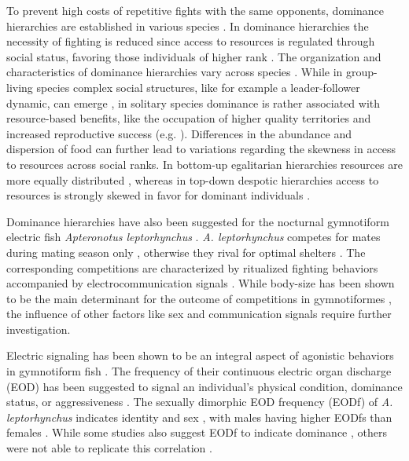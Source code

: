\documentclass[vruler,JEB]{COB}%
\newcommand{\Lepto}{\textit{Apteronotus leptorhynchus}}
\newcommand{\lepto}{\textit{A. leptorhynchus}}
\begin{document}
To prevent high costs of repetitive fights with the same opponents, dominance hierarchies are established in various species \citep{Creel1996, Janson1985, Cluttonbrock1979}. In dominance hierarchies the necessity of fighting is reduced since access to resources is regulated through social status, favoring those individuals of higher rank \citep{Wauters1992, Taves2009}. The organization and characteristics of dominance hierarchies vary across species \citep{Janson1985, Cigliano1993, Sapolsky2005}. While in group-living species complex social structures, like for example a leader-follower dynamic, can emerge \citep{Strandburg2018}, in solitary species dominance is rather associated with resource-based benefits, like the occupation of higher quality territories and increased reproductive success (e.g. \citealp{Cigliano1993}). Differences in the abundance and dispersion of food can further lead to variations regarding the skewness in access to resources across social ranks. In bottom-up egalitarian hierarchies resources are more equally distributed \citep{Sapolsky2005}, whereas in top-down despotic hierarchies access to resources is strongly skewed in favor for dominant individuals \citep{Kappeler2008}.

Dominance hierarchies have also been suggested for the nocturnal gymnotiform electric fish \Lepto{} \citep{Dunlap2002,Stamper2010,Raab2019}. \lepto{} competes for mates during mating season only \citep{Hagedorn1985, Henninger2018}, otherwise they rival for optimal shelters \citep{Dunlap2002}. The corresponding competitions are characterized by ritualized fighting behaviors accompanied by electrocommunication signals \citep{Triefenbach2008, Smith2013}. While body-size has been shown to be the main determinant for the outcome of competitions in gymnotiformes \citep{Silva2012, Triefenbach2008, Dunlap2002}, the influence of other factors like sex and communication signals require further investigation.

Electric signaling has been shown to be an integral aspect of agonistic behaviors in gymnotiform fish \citep{Westby1970, Silva2012, Hupe2008,Henninger2018}. The frequency of their continuous electric organ discharge (EOD) has been suggested to signal an individual's physical condition, dominance status, or aggressiveness \citep{Westby1970, Hagedorn1985, Cuddy2012}. The sexually dimorphic EOD frequency (EODf) of \lepto{} indicates identity and sex \citep{Henninger2020}, with males having higher EODfs than females \citep{Meyer1987}. While some studies also suggest EODf to indicate dominance \citep{Hagedorn1985, Dunlap2002, Henninger2018, Raab2019}, others were not able to replicate this correlation \citep{Triefenbach2008}.
\end{document}
